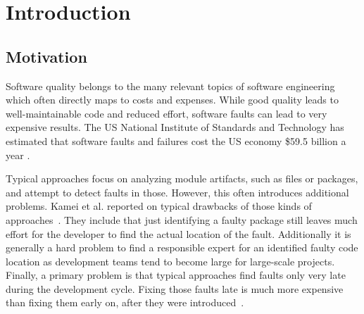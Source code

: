 \section{Introduction}
\label{sec:intro}

\subsection{Motivation}

Software quality belongs to the many relevant topics of software engineering which often directly maps to costs and expenses. While good quality leads to well-maintainable code and reduced effort, software faults can lead to very expensive results. The US National Institute of Standards and Technology has estimated that software faults and failures cost the US economy \$59.5 billion a year \cite{nist,Rosen2015}.

Typical approaches focus on analyzing module artifacts, such as files or packages, and attempt to detect faults in those. However, this often introduces additional problems.
Kamei et al. reported on typical drawbacks of those kinds of approaches~\cite{Kamei2013}. They include that just identifying a faulty package still leaves much effort for the developer to find the actual location of the fault. Additionally it is generally a hard problem to find a responsible expert for an identified faulty code location as development teams tend to become large for large-scale projects.
Finally, a primary problem is that typical approaches find faults only very late during the development cycle. Fixing those faults late is much more expensive than fixing them early on, after they were introduced~\cite{Martin08}.

